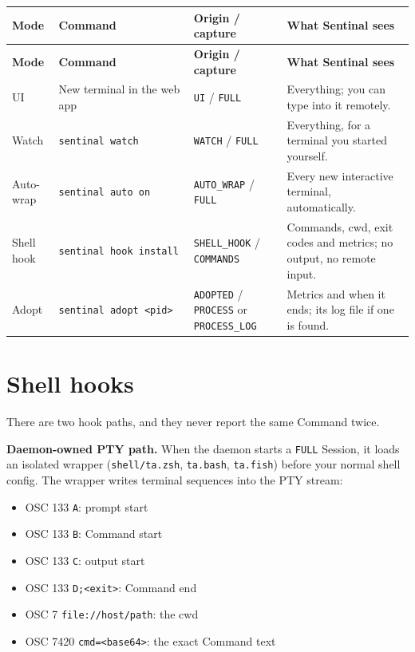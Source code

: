 \begin{small}
\begin{longtable}{>{\raggedright\arraybackslash}p{0.107\dimexpr \linewidth-8\tabcolsep\relax}>{\raggedright\arraybackslash}p{0.205\dimexpr \linewidth-8\tabcolsep\relax}>{\raggedright\arraybackslash}p{0.269\dimexpr \linewidth-8\tabcolsep\relax}>{\raggedright\arraybackslash}p{0.419\dimexpr \linewidth-8\tabcolsep\relax}}
\toprule
\textbf{Mode} & \textbf{Command} & \textbf{Origin / capture} & \textbf{What Sentinal sees} \\
\midrule
\endfirsthead
\toprule
\textbf{Mode} & \textbf{Command} & \textbf{Origin / capture} & \textbf{What Sentinal sees} \\
\midrule
\endhead
UI & New terminal in the web app & \texttt{UI} / \texttt{FULL} & Everything; you can type into it remotely. \\
Watch & \texttt{sentinal\ watch} & \texttt{WATCH} / \texttt{FULL} & Everything, for a terminal you started yourself. \\
Auto-wrap & \texttt{sentinal\ auto\ on} & \texttt{AUTO\_\allowbreak{}WRAP} / \texttt{FULL} & Every new interactive terminal, automatically. \\
Shell hook & \texttt{sentinal\ hook\ install} & \texttt{SHELL\_\allowbreak{}HOOK} / \texttt{COMMANDS} & Commands, cwd, exit codes and metrics; no output, no remote input. \\
Adopt & \texttt{sentinal\ adopt\ \textless{}pid\textgreater{}} & \texttt{ADOPTED} / \texttt{PROCESS} or \texttt{PROCESS\_\allowbreak{}LOG} & Metrics and when it ends; its log file if one is found. \\
\bottomrule
\end{longtable}
\end{small}

\section{\texorpdfstring{Shell hooks}{Shell hooks}}

There are two hook paths, and they never report the same Command twice.

\textbf{Daemon-owned PTY path.} When the daemon starts a \texttt{FULL} Session, it loads an isolated wrapper (\texttt{shell/\allowbreak{}ta.\allowbreak{}zsh}, \texttt{ta.\allowbreak{}bash}, \texttt{ta.\allowbreak{}fish}) before your normal shell config. The wrapper writes terminal sequences into the PTY stream:

\begin{itemize}
\item OSC 133 \texttt{A}: prompt start
\item OSC 133 \texttt{B}: Command start
\item OSC 133 \texttt{C}: output start
\item OSC 133 \texttt{D;\textless{}exit\textgreater{}}: Command end
\item OSC 7 \texttt{file:\allowbreak{}/\allowbreak{}/\allowbreak{}host/\allowbreak{}path}: the cwd
\item OSC 7420 \texttt{cmd=\allowbreak{}\textless{}base64\textgreater{}}: the exact Command text
\end{itemize}

